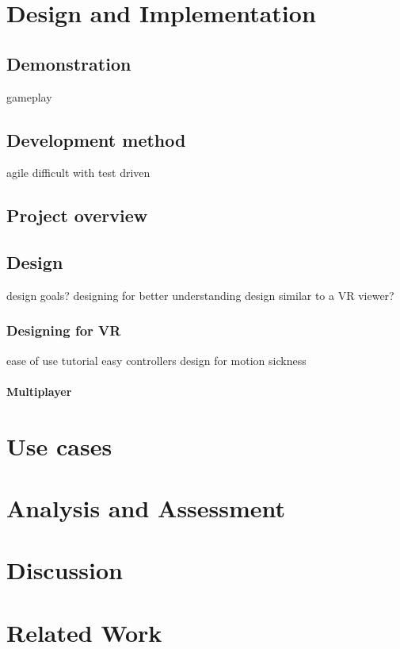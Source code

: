 \documentclass[a4paper]{report}
\begin{document}
\chapter{Design and Implementation}\label{Design and Implementation}

\section{Demonstration}\label{demonstration}
gameplay

\section{Development method}
agile
difficult with test driven


\section{Project overview}\label{CodeStructure}

\section{Design}
design goals?
designing for better understanding
design similar to a VR viewer?

\subsection{Designing for VR}
ease of use
tutorial
easy controllers
design for motion sickness
\subsubsection{Multiplayer}

\chapter{Use cases}\label{UseCases}

\chapter{Analysis and Assessment}\label{Analysis and Assessment}

\chapter{Discussion}\label{Discussion}

\chapter{Related Work}\label{Related Work}
\end{document}
